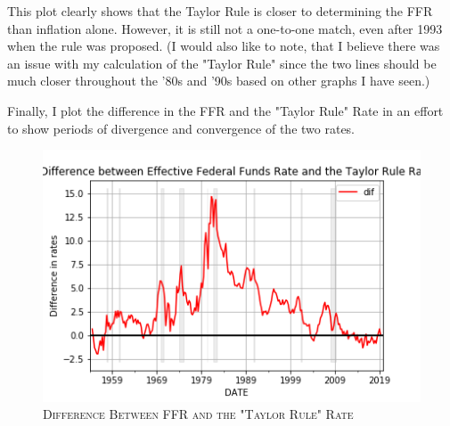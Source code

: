\documentclass[12pt]{article}
\newenvironment{question}[2][Question]{\begin{trivlist}
\item[\hskip \labelsep {\bfseries #1}\hskip \labelsep {\bfseries #2.}]}{\end{trivlist}}
\begin{document}
\begin{question}{3}
\begin{figure}[!h]
\end{figure}

This plot clearly shows that the Taylor Rule is closer to determining the FFR than inflation alone. However, it is still not a one-to-one match, even after 1993 when the rule was proposed. (I would also like to note, that I believe there was an issue with my calculation of the "Taylor Rule" since the two lines should be much closer throughout the '80s and '90s based on other graphs I have seen.)

Finally, I plot the difference in the FFR and the "Taylor Rule" Rate in an effort to show periods of divergence and convergence of the two rates.

\begin{figure}[!h]
\centering
\caption{\textsc{Difference Between FFR and the "Taylor Rule" Rate}}
\includegraphics[scale=0.6]{difplot_graph.png}

\end{figure}

\end{question}
\newpage
\end{document}
